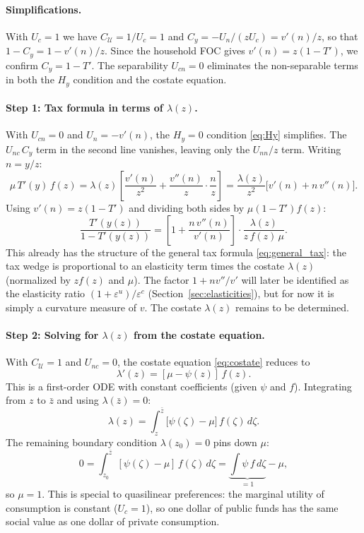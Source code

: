 \documentclass[12pt,a4paper]{article}
\theoremstyle{definition}
\theoremstyle{plain}
\theoremstyle{remark}
\newcommand{\zbar}{\bar{z}}
\newcommand{\zlow}{z_{\scriptscriptstyle 0}}
\newcommand{\calU}{\mathcal{U}}
\begin{document}
\paragraph{Simplifications.}
With $U_c = 1$ we have $C_{\calU} = 1/U_c = 1$ and $C_y = -U_n/(zU_c) = v'(n)/z$, so that $1 - C_y = 1 - v'(n)/z$. Since the household FOC gives $v'(n) = z(1-T')$, we confirm $C_y = 1 - T'$. The separability $U_{cn} = 0$ eliminates the non-separable terms in both the $H_y$ condition and the costate equation.

\paragraph{Step 1: Tax formula in terms of $\lambda(z)$.}
With $U_{cn} = 0$ and $U_n = -v'(n)$, the $H_y = 0$ condition \eqref{eq:Hy} simplifies. The $U_{nc}\,C_y$ term in the second line vanishes, leaving only the $U_{nn}/z$ term. Writing $n = y/z$:
\[
  \mu\, T'(y)\, f(z) = \lambda(z)\left[\frac{v'(n)}{z^2} + \frac{v''(n)}{z} \cdot \frac{n}{z}\right]
  = \frac{\lambda(z)}{z^2}\bigl[v'(n) + n\, v''(n)\bigr].
\]
Using $v'(n) = z(1-T')$ and dividing both sides by $\mu(1-T')f(z)$:
\begin{equation}
\label{eq:QL_tax}
  \frac{T'(y(z))}{1 - T'(y(z))} = \left[1 + \frac{n\, v''(n)}{v'(n)}\right] \cdot \frac{\lambda(z)}{z\, f(z) \, \mu}.
\end{equation}
This already has the structure of the general tax formula \eqref{eq:general_tax}: the tax wedge is proportional to an elasticity term times the costate $\lambda(z)$ (normalized by $zf(z)$ and $\mu$). The factor $1 + nv''/v'$ will later be identified as the elasticity ratio $(1+\varepsilon^u)/\varepsilon^c$ (Section~\ref{sec:elasticities}), but for now it is simply a curvature measure of $v$. The costate $\lambda(z)$ remains to be determined.

\paragraph{Step 2: Solving for $\lambda(z)$ from the costate equation.}
With $C_{\calU} = 1$ and $U_{nc} = 0$, the costate equation \eqref{eq:costate} reduces to
\[
  \lambda'(z) = [\mu - \psi(z)]\, f(z).
\]
This is a first-order ODE with constant coefficients (given $\psi$ and $f$). Integrating from $z$ to $\zbar$ and using $\lambda(\zbar) = 0$:
\begin{equation}
\label{eq:QL_lambda}
  \lambda(z) = \int_{z}^{\zbar} \bigl[\psi(\zeta) - \mu\bigr]\, f(\zeta)\, d\zeta.
\end{equation}
The remaining boundary condition $\lambda(\zlow) = 0$ pins down $\mu$:
\[
  0 = \int_{\zlow}^{\zbar} [\psi(\zeta) - \mu]\, f(\zeta)\, d\zeta
  = \underbrace{\int \psi\, f\, d\zeta}_{= 1} - \mu,
\]
so $\mu = 1$. This is special to quasilinear preferences: the marginal utility of consumption is constant ($U_c = 1$), so one dollar of public funds has the same social value as one dollar of private consumption.
\end{document}

